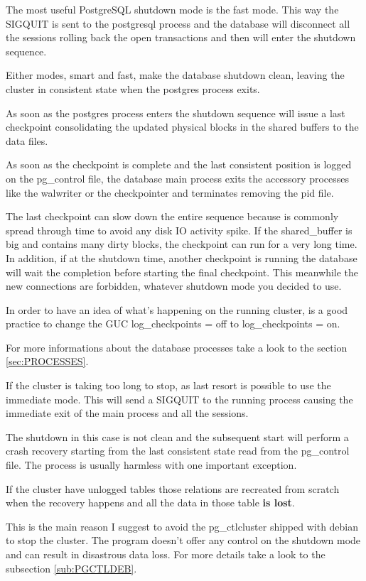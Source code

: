The most useful PostgreSQL shutdown mode is the fast mode. This way the SIGQUIT 
is sent to the postgresql process and the database will disconnect all the 
sessions rolling back the open transactions and then will enter the shutdown 
sequence. 

Either modes, smart and fast, make the database shutdown clean, leaving the 
cluster in consistent state when the postgres process exits. 

As soon as the postgres process enters the shutdown sequence will issue a last 
checkpoint consolidating the updated physical blocks in the shared buffers to 
the data files.

As soon as the checkpoint is complete and the last consistent position is 
logged on the pg\_control file, the database main process exits the accessory 
processes like the walwriter or the checkpointer and terminates removing the 
pid file.

The last checkpoint can slow down the entire sequence because is commonly 
spread through time to avoid any disk IO activity spike. If the shared\_buffer 
is big and contains many dirty blocks, the checkpoint can run for a very long 
time. In addition, if at the shutdown time, another checkpoint is running the 
database will wait the completion before starting the final checkpoint. This 
meanwhile the new connections are forbidden, whatever shutdown mode you decided 
to use. 

In order to have an idea  of what's happening on the running cluster, is a good 
practice to change the GUC log\_checkpoints = off to log\_checkpoints = on.


For more informations about the database processes take a look to the section 
\ref{sec:PROCESSES}.

If the cluster is taking too long to stop, as last resort is possible to 
use the immediate mode. This will send a SIGQUIT to the running process causing 
the immediate exit of the main process and all the sessions. 

The shutdown in this case is not clean and the subsequent start will perform a 
crash recovery starting from the last consistent state read from the 
pg\_control file. The process is usually harmless with one important exception.

If the cluster have unlogged tables those relations are recreated from scratch 
when the recovery happens and all the data in those table \textbf{is lost}.

This is the main reason I suggest to avoid the pg\_ctlcluster shipped with 
debian to stop the cluster. The program doesn't offer any control on the 
shutdown mode and can result in disastrous data loss. For more details take a 
look to the subsection \ref{sub:PGCTLDEB}.

